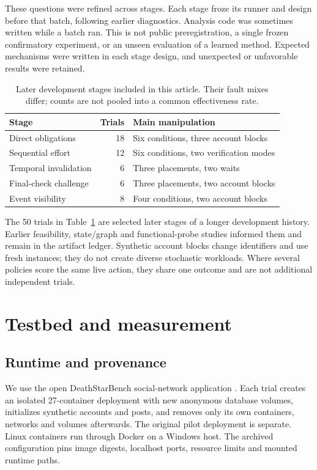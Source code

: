 \documentclass[manuscript,review,nonacm]{acmart}
\begin{document}
These questions were refined across stages. Each stage froze its runner and design before that batch, following earlier diagnostics. Analysis code was sometimes written while a batch ran. This is not public preregistration, a single frozen confirmatory experiment, or an unseen evaluation of a learned method. Expected mechanisms were written in each stage design, and unexpected or unfavorable results were retained.

\begin{table}[t]
\caption{Later development stages included in this article. Their fault mixes differ; counts are not pooled into a common effectiveness rate.}
\label{tab:stages}
\centering
\begin{tabularx}{\linewidth}{@{}lrX@{}}
\toprule Stage & Trials & Main manipulation \\
\midrule
Direct obligations & 18 & Six conditions, three account blocks \\
Sequential effort & 12 & Six conditions, two verification modes \\
Temporal invalidation & 6 & Three placements, two waits \\
Final-check challenge & 6 & Three placements, two account blocks \\
Event visibility & 8 & Four conditions, two account blocks \\
\bottomrule
\end{tabularx}
\end{table}

The 50 trials in Table~\ref{tab:stages} are selected later stages of a longer development history. Earlier feasibility, state/graph and functional-probe studies informed them and remain in the artifact ledger. Synthetic account blocks change identifiers and use fresh instances; they do not create diverse stochastic workloads. Where several policies score the same live action, they share one outcome and are not additional independent trials.

\section{Testbed and measurement}
\subsection{Runtime and provenance}
We use the open DeathStarBench social-network application \cite{dsb}. Each trial creates an isolated 27-container deployment with new anonymous database volumes, initializes synthetic accounts and posts, and removes only its own containers, networks and volumes afterwards. The original pilot deployment is separate. Linux containers run through Docker on a Windows host. The archived configuration pins image digests, localhost ports, resource limits and mounted runtime paths.
\end{document}
